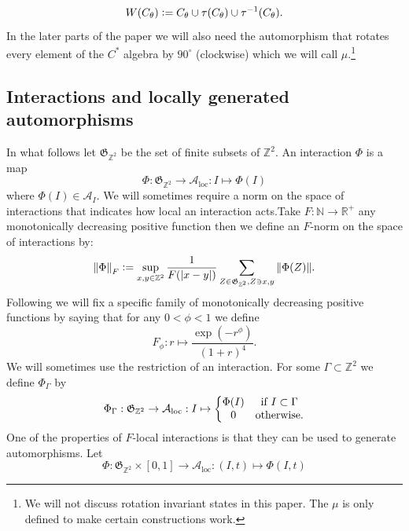\documentclass[12pt,a4paper,twoside]{article}
\newcommand{\defeq}{\vcentcolon=}
\let\originalleft\left
\let\originalright\right
\renewcommand{\left}{\mathopen{}\mathclose\bgroup\originalleft}
\renewcommand{\right}{\aftergroup\egroup\originalright}
\newcommand{\ZZ}{\mathbb Z}
\renewcommand{\AA}{\mathcal A}
\newcommand{\RR}{\mathbb R}
\newcommand{\NN}{\mathbb{N}}
\theoremstyle{definition}
\numberwithin{equation}{section}
\begin{document}
\begin{equation}
	W(C_\theta)\defeq C_\theta\cup\tau(C_\theta)\cup\tau^{-1}(C_\theta).
\end{equation}
In the later parts of the paper we will also need the automorphism that rotates every element of the $C^*$ algebra by $90^\circ$ (clockwise) which we will call $\mu$.\footnote{We will not discuss rotation invariant states in this paper. The $\mu$ is only defined to make certain constructions work.}
\subsection{Interactions and locally generated automorphisms}
In what follows let $\mathfrak{G}_{\ZZ^2}$ be the set of finite subsets of $\ZZ^2$. An interaction $\Phi$ is a map
\begin{equation}
	\Phi: \mathfrak{G}_{\ZZ^2}\rightarrow \AA_{\text{loc}}: I \mapsto \Phi(I)
\end{equation}
where $\Phi(I)\in\AA_I$. We will sometimes require a norm on the space of interactions that indicates how local an interaction acts.Take $F:\NN\rightarrow \RR^+$ any monotonically decreasing positive function then we define an $F$-norm on the space of interactions by:
\begin{equation}
	\norm{\Phi}_F\defeq \sup_{x,y\in\ZZ^2}\frac{1}{F(\abs{x-y})}\sum_{Z\in\mathfrak{G}_{\ZZ^2},Z\ni x,y}\norm{\Phi(Z)}.
\end{equation}
Following \cite{ogata2021h3gmathbb} we will fix a specific family of monotonically decreasing positive functions by saying that for any $0<\phi<1$ we define
\begin{equation}
	F_\phi:r\mapsto \frac{\exp(-r^\phi)}{(1+r)^4}.
\end{equation}
We will sometimes use the restriction of an interaction. For some $\Gamma\subset\ZZ^2$ we define $\Phi_\Gamma$ by
\begin{equation}
	\Phi_\Gamma:\mathfrak{G}_{\ZZ^2}\rightarrow \AA_{\text{loc}}:I\mapsto\left\{\begin{matrix}
		\Phi(I)&\text{if }I\subset\Gamma\\0&\text{otherwise}.
	\end{matrix}\right.
\end{equation}
One of the properties of $F$-local interactions is that they can be used to generate automorphisms. Let
\begin{equation}
	\Phi:\mathfrak{G}_{\ZZ^2}\times [0,1]\rightarrow \AA_{\text{loc}}:(I,t)\mapsto \Phi(I,t)
\end{equation}
\end{document}
